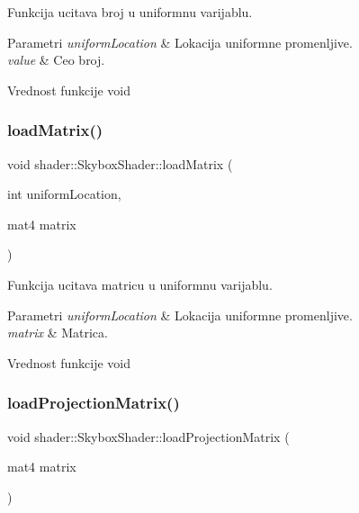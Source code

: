 Funkcija ucitava broj u uniformnu varijablu. 


\begin{DoxyParams}{Parametri}
{\em uniform\+Location} & Lokacija uniformne promenljive. \\
\hline
{\em value} & Ceo broj. \\
\hline
\end{DoxyParams}
\begin{DoxyReturn}{Vrednost funkcije}
void 
\end{DoxyReturn}
\mbox{\label{classshader_1_1SkyboxShader_aa393967943968af99c1eab26f510f856}} 
\subsubsection{\texorpdfstring{load\+Matrix()}{loadMatrix()}}
{\footnotesize\ttfamily void shader\+::\+Skybox\+Shader\+::load\+Matrix (\begin{DoxyParamCaption}\item[{int}]{uniform\+Location,  }\item[{mat4}]{matrix }\end{DoxyParamCaption})}



Funkcija ucitava matricu u uniformnu varijablu. 


\begin{DoxyParams}{Parametri}
{\em uniform\+Location} & Lokacija uniformne promenljive. \\
\hline
{\em matrix} & Matrica. \\
\hline
\end{DoxyParams}
\begin{DoxyReturn}{Vrednost funkcije}
void 
\end{DoxyReturn}
\mbox{\label{classshader_1_1SkyboxShader_a6535b40978fc4a7bbe2b26b20f4b55c4}} 
\subsubsection{\texorpdfstring{load\+Projection\+Matrix()}{loadProjectionMatrix()}}
{\footnotesize\ttfamily void shader\+::\+Skybox\+Shader\+::load\+Projection\+Matrix (\begin{DoxyParamCaption}\item[{mat4}]{matrix }\end{DoxyParamCaption})}




